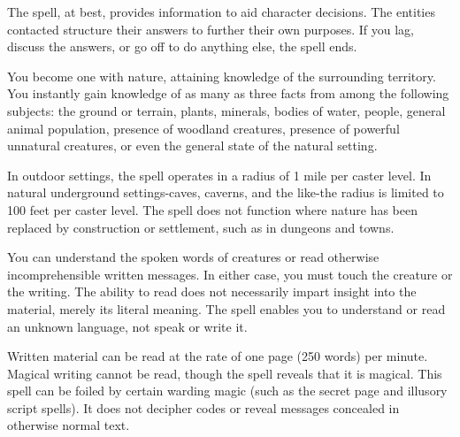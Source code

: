 \begin{multicols}{2}
\begin{small}
\smallskip\noindent The spell, at best, provides information to aid character decisions. The entities contacted structure their answers to further their own purposes. If you lag, discuss the answers, or go off to do anything else, the spell ends.


\noindent You become one with nature, attaining knowledge of the surrounding territory. You instantly gain knowledge of as many as three facts from among the following subjects: the ground or terrain, plants, minerals, bodies of water, people, general animal population, presence of woodland creatures, presence of powerful unnatural creatures, or even the general state of the natural setting.

\smallskip\noindent In outdoor settings, the spell operates in a radius of 1 mile per caster level. In natural underground settings-caves, caverns, and the like-the radius is limited to 100 feet per caster level. The spell does not function where nature has been replaced by construction or settlement, such as in dungeons and towns.

\noindent You can understand the spoken words of creatures or read otherwise incomprehensible written messages. In either case, you must touch the creature or the writing. The ability to read does not necessarily impart insight into the material, merely its literal meaning. The spell enables you to understand or read an unknown language, not speak or write it.

\smallskip\noindent Written material can be read at the rate of one page (250 words) per minute. Magical writing cannot be read, though the spell reveals that it is magical. This spell can be foiled by certain warding magic (such as the secret page and illusory script spells). It does not decipher codes or reveal messages concealed in otherwise normal text.


\end{small}
\end{multicols}

